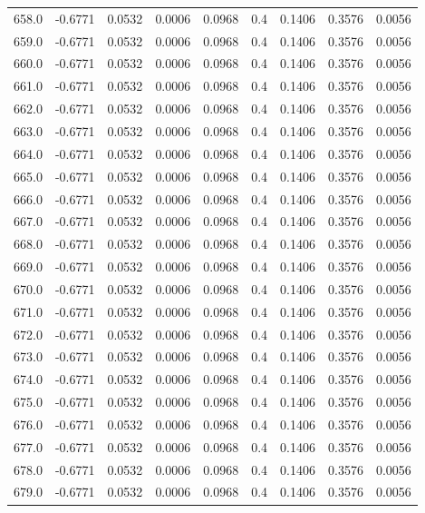 \begin{longtable}{lrrrrrrrr}
658.0 & -0.6771 & 0.0532 & 0.0006 & 0.0968 & 0.4 & 0.1406 & 0.3576 & 0.0056 \\
659.0 & -0.6771 & 0.0532 & 0.0006 & 0.0968 & 0.4 & 0.1406 & 0.3576 & 0.0056 \\
660.0 & -0.6771 & 0.0532 & 0.0006 & 0.0968 & 0.4 & 0.1406 & 0.3576 & 0.0056 \\
661.0 & -0.6771 & 0.0532 & 0.0006 & 0.0968 & 0.4 & 0.1406 & 0.3576 & 0.0056 \\
662.0 & -0.6771 & 0.0532 & 0.0006 & 0.0968 & 0.4 & 0.1406 & 0.3576 & 0.0056 \\
663.0 & -0.6771 & 0.0532 & 0.0006 & 0.0968 & 0.4 & 0.1406 & 0.3576 & 0.0056 \\
664.0 & -0.6771 & 0.0532 & 0.0006 & 0.0968 & 0.4 & 0.1406 & 0.3576 & 0.0056 \\
665.0 & -0.6771 & 0.0532 & 0.0006 & 0.0968 & 0.4 & 0.1406 & 0.3576 & 0.0056 \\
666.0 & -0.6771 & 0.0532 & 0.0006 & 0.0968 & 0.4 & 0.1406 & 0.3576 & 0.0056 \\
667.0 & -0.6771 & 0.0532 & 0.0006 & 0.0968 & 0.4 & 0.1406 & 0.3576 & 0.0056 \\
668.0 & -0.6771 & 0.0532 & 0.0006 & 0.0968 & 0.4 & 0.1406 & 0.3576 & 0.0056 \\
669.0 & -0.6771 & 0.0532 & 0.0006 & 0.0968 & 0.4 & 0.1406 & 0.3576 & 0.0056 \\
670.0 & -0.6771 & 0.0532 & 0.0006 & 0.0968 & 0.4 & 0.1406 & 0.3576 & 0.0056 \\
671.0 & -0.6771 & 0.0532 & 0.0006 & 0.0968 & 0.4 & 0.1406 & 0.3576 & 0.0056 \\
672.0 & -0.6771 & 0.0532 & 0.0006 & 0.0968 & 0.4 & 0.1406 & 0.3576 & 0.0056 \\
673.0 & -0.6771 & 0.0532 & 0.0006 & 0.0968 & 0.4 & 0.1406 & 0.3576 & 0.0056 \\
674.0 & -0.6771 & 0.0532 & 0.0006 & 0.0968 & 0.4 & 0.1406 & 0.3576 & 0.0056 \\
675.0 & -0.6771 & 0.0532 & 0.0006 & 0.0968 & 0.4 & 0.1406 & 0.3576 & 0.0056 \\
676.0 & -0.6771 & 0.0532 & 0.0006 & 0.0968 & 0.4 & 0.1406 & 0.3576 & 0.0056 \\
677.0 & -0.6771 & 0.0532 & 0.0006 & 0.0968 & 0.4 & 0.1406 & 0.3576 & 0.0056 \\
678.0 & -0.6771 & 0.0532 & 0.0006 & 0.0968 & 0.4 & 0.1406 & 0.3576 & 0.0056 \\
679.0 & -0.6771 & 0.0532 & 0.0006 & 0.0968 & 0.4 & 0.1406 & 0.3576 & 0.0056 \\

\end{longtable}
